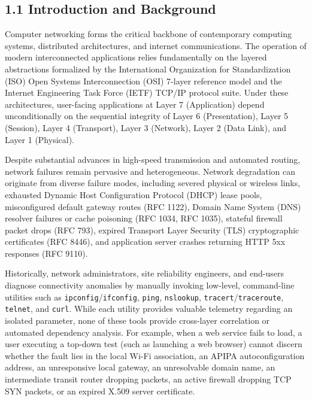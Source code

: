 \documentclass[
]{article}
\newcounter{none} %
\begin{document}
\subsection{1.1 Introduction and Background}\label{introduction-and-background}

Computer networking forms the critical backbone of contemporary computing systems, distributed architectures, and internet communications. The operation of modern interconnected applications relies fundamentally on the layered abstractions formalized by the International Organization for Standardization (ISO) Open Systems Interconnection (OSI) 7-layer reference model and the Internet Engineering Task Force (IETF) TCP/IP protocol suite. Under these architectures, user-facing applications at Layer 7 (Application) depend unconditionally on the sequential integrity of Layer 6 (Presentation), Layer 5 (Session), Layer 4 (Transport), Layer 3 (Network), Layer 2 (Data Link), and Layer 1 (Physical).

Despite substantial advances in high-speed transmission and automated routing, network failures remain pervasive and heterogeneous. Network degradation can originate from diverse failure modes, including severed physical or wireless links, exhausted Dynamic Host Configuration Protocol (DHCP) lease pools, misconfigured default gateway routes (RFC 1122), Domain Name System (DNS) resolver failures or cache poisoning (RFC 1034, RFC 1035), stateful firewall packet drops (RFC 793), expired Transport Layer Security (TLS) cryptographic certificates (RFC 8446), and application server crashes returning HTTP 5xx responses (RFC 9110).

Historically, network administrators, site reliability engineers, and end-users diagnose connectivity anomalies by manually invoking low-level, command-line utilities such as \texttt{ipconfig}/\texttt{ifconfig}, \texttt{ping}, \texttt{nslookup}, \texttt{tracert}/\texttt{traceroute}, \texttt{telnet}, and \texttt{curl}. While each utility provides valuable telemetry regarding an isolated parameter, none of these tools provide cross-layer correlation or automated dependency analysis. For example, when a web service fails to load, a user executing a top-down test (such as launching a web browser) cannot discern whether the fault lies in the local Wi-Fi association, an APIPA autoconfiguration address, an unresponsive local gateway, an unresolvable domain name, an intermediate transit router dropping packets, an active firewall dropping TCP SYN packets, or an expired X.509 server certificate.
\end{document}
